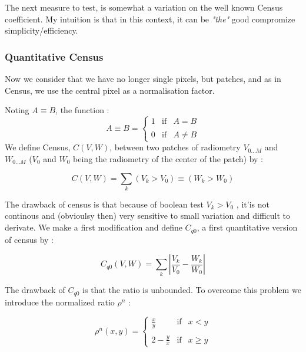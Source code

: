 \label{LIR:CQ}

The next measure to test, is somewhat a variation on the well known
Census coefficient. My intuition is that in this context, it can be \emph{"the"} good compromize
simplicity/efficiency.

\subsubsection{Quantitative Census}

Now we consider that we have no longer single pixels, but patches, and as
in Census, we use the central pixel as a normalisation factor. 

Noting $A \equiv B$, the function :
\begin{equation}
 A \equiv B  =
\left\{ \begin{array}{rcl}
1 & \mbox{if}  & A = B\\
\\
0 & \mbox{if}  & A \neq B
\end{array}\right.
\end{equation}
We define
Census, $C(V,W)$,  between two patches of radiometry $V_{0 \dots M}$ and $W_{0 \dots M}$ ($V_0$ and $W_0$ being the radiometry of the center of the patch) by :

\begin{equation}
      C(V,W)  = \sum_k (V_k > V_0) \equiv (W_k>W_0)
\end{equation}


The drawback of census is  that because of boolean test $V_k > V_0$ , it'is
not continous and (obvioulsy then) very sensitive to small variation and  difficult to derivate.
We make a first modification and define $C_{q0}$, a first quantitative version of census 
by :

\begin{equation}
      C_{q0} (V,W)  = \sum_k | \frac{V_k}{V_0} - \frac{W_k}{W_0} |
\end{equation}

The drawback of $C_{q0}$ is that the ratio is unbounded.
To overcome this problem we introduce the normalized ratio $\rho^n$ :

\begin{equation}
 \rho^n (x,y)  =
\left\{ \begin{array}{rcl}
\frac{x}{y} & \mbox{if}  & x<y\\
\\
2-\frac{y}{x} & \mbox{if}  & x \geq y
\end{array}\right.
\end{equation}

